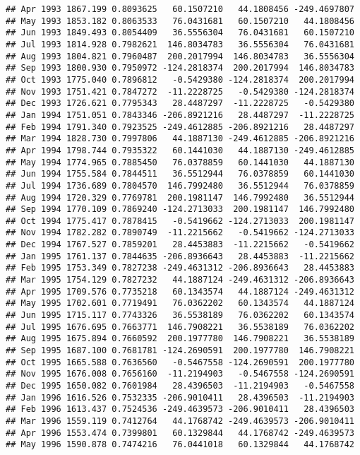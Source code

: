 \documentclass[]{article}
\begin{document}
\begin{verbatim}
## Apr 1993 1867.199 0.8093625   60.1507210   44.1808456 -249.4697807
## May 1993 1853.182 0.8063533   76.0431681   60.1507210   44.1808456
## Jun 1993 1849.493 0.8054409   36.5556304   76.0431681   60.1507210
## Jul 1993 1814.928 0.7982621  146.8034783   36.5556304   76.0431681
## Aug 1993 1804.821 0.7960487  200.2017994  146.8034783   36.5556304
## Sep 1993 1800.930 0.7950972 -124.2818374  200.2017994  146.8034783
## Oct 1993 1775.040 0.7896812   -0.5429380 -124.2818374  200.2017994
## Nov 1993 1751.421 0.7847272  -11.2228725   -0.5429380 -124.2818374
## Dec 1993 1726.621 0.7795343   28.4487297  -11.2228725   -0.5429380
## Jan 1994 1751.051 0.7843346 -206.8921216   28.4487297  -11.2228725
## Feb 1994 1791.340 0.7923525 -249.4612885 -206.8921216   28.4487297
## Mar 1994 1828.730 0.7997806   44.1887130 -249.4612885 -206.8921216
## Apr 1994 1798.744 0.7935322   60.1441030   44.1887130 -249.4612885
## May 1994 1774.965 0.7885450   76.0378859   60.1441030   44.1887130
## Jun 1994 1755.584 0.7844511   36.5512944   76.0378859   60.1441030
## Jul 1994 1736.689 0.7804570  146.7992480   36.5512944   76.0378859
## Aug 1994 1720.329 0.7769781  200.1981147  146.7992480   36.5512944
## Sep 1994 1770.109 0.7869240 -124.2713033  200.1981147  146.7992480
## Oct 1994 1775.417 0.7878415   -0.5419662 -124.2713033  200.1981147
## Nov 1994 1782.282 0.7890749  -11.2215662   -0.5419662 -124.2713033
## Dec 1994 1767.527 0.7859201   28.4453883  -11.2215662   -0.5419662
## Jan 1995 1761.137 0.7844635 -206.8936643   28.4453883  -11.2215662
## Feb 1995 1753.349 0.7827238 -249.4631312 -206.8936643   28.4453883
## Mar 1995 1754.129 0.7827232   44.1887124 -249.4631312 -206.8936643
## Apr 1995 1709.576 0.7735218   60.1343574   44.1887124 -249.4631312
## May 1995 1702.601 0.7719491   76.0362202   60.1343574   44.1887124
## Jun 1995 1715.117 0.7743326   36.5538189   76.0362202   60.1343574
## Jul 1995 1676.695 0.7663771  146.7908221   36.5538189   76.0362202
## Aug 1995 1675.894 0.7660592  200.1977780  146.7908221   36.5538189
## Sep 1995 1687.100 0.7681781 -124.2690591  200.1977780  146.7908221
## Oct 1995 1665.588 0.7636560   -0.5467558 -124.2690591  200.1977780
## Nov 1995 1676.008 0.7656160  -11.2194903   -0.5467558 -124.2690591
## Dec 1995 1650.082 0.7601984   28.4396503  -11.2194903   -0.5467558
## Jan 1996 1616.526 0.7532335 -206.9010411   28.4396503  -11.2194903
## Feb 1996 1613.437 0.7524536 -249.4639573 -206.9010411   28.4396503
## Mar 1996 1559.119 0.7412764   44.1768742 -249.4639573 -206.9010411
## Apr 1996 1553.474 0.7399801   60.1329844   44.1768742 -249.4639573
## May 1996 1590.878 0.7474216   76.0441018   60.1329844   44.1768742

\end{verbatim}
\end{document}

